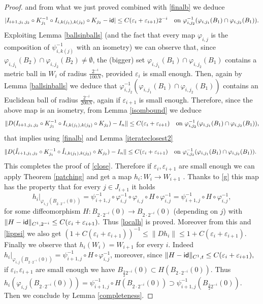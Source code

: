 \documentclass[11pt]{article}
\newcommand{\eps}{\varepsilon}
\renewcommand{\phi}{\varphi}
\theoremstyle{plain}
\theoremstyle{definition}
\numberwithin{equation}{section}
\begin{document}
\begin{proof}
	and from what we just proved combined with \eqref{finalb} we deduce
	$$|I_{i+1,j_1,j_2}\circ K_{j_1}^{-1}\circ  I_{i,k(j_1),k(j_2)}\circ K_{j_2}-{\sf{id}}|\le C(\eps_i+\eps_{i+1})2^{-i} 
  \text{\quad 	on $\phi_{i,j_2}^{-1}( \phi_{i,j_1}(B_1)\cap\phi_{i,j_2}(B_1)) $.}
 $$
 Exploiting Lemma \ref{ballsinballs} (and the fact   that every map $\phi_{i,j}$ is the composition of $\psi_{i,k(j)}^{-1}$ with an isometry) we can observe that, since $ \phi_{i,j_1}(B_2)\cap\phi_{i,j_2}(B_2) \neq \emptyset $, the (bigger) set $ \phi_{i,j_1}(B_1)\cap\phi_{i,j_2}(B_1)$ contains a metric ball in $W_{i}$ of radius $\frac{2^{-i}}{100N}$, provided $\eps_{i}$ is small enough. Then, again by Lemma \ref{ballsinballs} we deduce that $\phi_{i,j_2}^{-1}( \phi_{i,j_1}(B_1)\cap\phi_{i,j_2}(B_1)) $ contains an Euclidean ball of radius $\frac{2^{-i}}{200N}$, again if $\eps_{i+1}$ is small enough. Therefore, since the above map is an isometry, from Lemma \ref{isombound} we deduce 
	$$\|D(I_{i+1,j_1,j_2}\circ K_{j_1}^{-1}\circ  I_{i,k(j_1),k(j_2)}\circ K_{j_2})-I_n\|\le C(\eps_i+\eps_{i+1}) 
 \text{\quad on $\phi_{i,j_2}^{-1}( \phi_{i,j_1}(B_1)\cap\phi_{i,j_2}(B_1)) $,}
 $$
	 that implies using \eqref{finalb} and Lemma \ref{iterateclosest2}
	$$\|D(\hat I_{i+1,j_1,j_2}\circ K_{j_1}^{-1}\circ  \hat I_{i,k(j_1),k(j_2)}\circ K_{j_2})-I_n\|\le C(\eps_i+\eps_{i+1})
  \text{\quad on $\phi_{i,j_2}^{-1}( \phi_{i,j_1}(B_1)\cap\phi_{i,j_2}(B_1)) $. }
 $$
	This completes the proof of \eqref{close}.
	Therefore if $\eps_i,\eps_{i+1}$ are small enough we can apply Theorem \ref{patching} and get a map $h_i : W_i \to W_{i+1}$ . Thanks to \eqref{g} this map has the property that for every $j \in J_{i+1}$ it holds 
	\begin{equation}
		h_i|_{\phi_{i,j}(B_{2 \cdot 2^{-i}}(0))}=\psi_{i+1,j}^{-1} \circ  \phi_{i,j}^{-1} \circ \phi_{i,j}\circ H \circ \phi_{i,j}^{-1} =\psi_{i+1,j}^{-1} \circ H \circ \phi_{i,j}^{-1},
	\end{equation}
	for some diffeomorphism $H: B_{2\cdot 2^{-i}}(0) \to B_{2\cdot 2^{-i}}(0)$  (depending on $j$) with $\|H-{\sf{id}} \|_{C^1,2^{-i}}\le C(\eps_i+\eps_{i+1}).$ Thus \eqref{localh} is proved. Moreover  from this and \eqref{lippsi} we also get $(1+C(\eps_i+\eps_{i+1}))^{-1}\le \|Dh_i\|\le1+C(\eps_i+\eps_{i+1})$. 
	Finally we observe that $h_i(W_i)=W_{i+1}$ for every $i$. Indeed $h_i|_{\phi_{i,j}(B_{2 \cdot 2^{-i}}(0))}=\psi_{i+1,j}^{-1} \circ H \circ \phi_{i,j}^{-1}$, moreover, since $\|H-{\sf{id}} \|_{C^1,t}\le C(\eps_i+\eps_{i+1}),$ if $\eps_i,\eps_{i+1}$ are small enough we have $B_{\frac{3}{2} 2^{-i}}(0)\subset H(B_{2 \cdot 2^{-i}}(0))$. Thus $h_i(\phi_{i,j}(B_{2 \cdot 2^{-i}}(0)))=\psi_{i+1,j}^{-1} \circ H(B_{2 \cdot 2^{-i}}(0)) \supset \psi_{i+1,j}^{-1}(B_{ \frac{3}{2}2^{-i}}(0)).$ Then we conclude by Lemma \ref{completeness}.
\end{proof}
\end{document}

